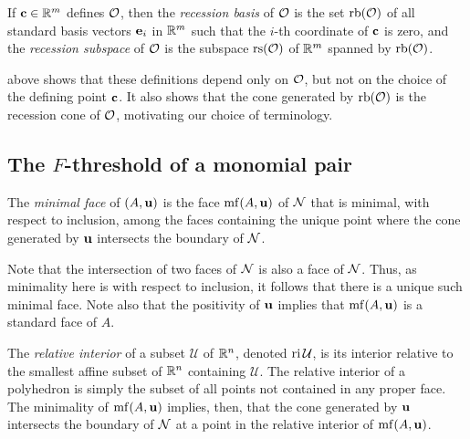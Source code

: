 \documentclass{amsart}
\begin{document}
\begin{definition}
   If $\mathbf{c} \in \mathbb{R}^m$ defines $\mathcal{O}$, then the \emph{recession basis} of $\mathcal{O}$ is the set $\operatorname{rb}(\mathcal{O})$ of all standard basis vectors $\mathbf{e}_i$ in $\mathbb{R}^m$ such that the $i$-th coordinate of $\mathbf{c}$ is zero, and the \emph{recession subspace} of $\mathcal{O}$ is the subspace $\operatorname{rs}(\mathcal{O})$ of $\mathbb{R}^m$ spanned by $\operatorname{rb}(\mathcal{O})$.
\end{definition}

 above shows that these definitions depend only on $\mathcal{O}$, but not on the choice of the defining point $\mathbf{c}$.
It also shows that the cone generated by $\operatorname{rb}(\mathcal{O})$ is the recession cone of $\mathcal{O}$, motivating our choice of terminology.




\subsection{The $F$-threshold of a monomial pair}

\begin{definition}
   The \emph{minimal face} of $(A, \mathbf{u})$ is the face $\operatorname{mf}(A, \mathbf{u})$ of $\mathcal{N}$ that is minimal, with respect to inclusion, among the faces containing the unique point where the cone generated by $\mathbf{u}$ intersects the boundary of $\mathcal{N}$.
\end{definition}

Note that the intersection of two faces of $\mathcal{N}$ is also a face of $\mathcal{N}$.
Thus, as minimality here is with respect to inclusion, it follows that there is a unique such minimal face.
Note also that the positivity of $\mathbf{u}$ implies that $\operatorname{mf}(A,\mathbf{u})$ is a standard face of $A$.

The \emph{relative interior} of a subset $\mathcal{U}$ of $\mathbb{R}^n$, denoted $\operatorname{ri} \mathcal{U}$, is its interior relative to the smallest affine subset of $\mathbb{R}^n$ containing $\mathcal{U}$.
The relative interior of a polyhedron is simply the subset of all points not contained in any proper face.
The minimality of $\operatorname{mf}(A,\mathbf{u})$ implies, then, that the cone generated by $\mathbf{u}$ intersects the boundary of $\mathcal{N}$ at a point in the relative interior of $\operatorname{mf}(A,\mathbf{u})$.
\end{document}

